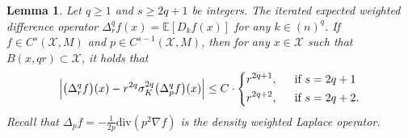 \documentclass{article}
\newcommand{\1}{\mathbf{1}}
\newcommand{\Xset}{\mathcal{X}}
\newcommand{\Ebb}{\mathbb{E}}
\theoremstyle{alden}
\theoremstyle{aldenthm}
\newtheorem{lemma}{Lemma}
\theoremstyle{definition}
\theoremstyle{remark}
\begin{document}
\begin{lemma}
	\label{lem:expected_difference_holder}
	Let $q \geq 1$ and $s \geq 2q + 1$ be integers. The iterated expected weighted difference operator  $\Delta_r^qf(x) = \Ebb[D_kf(x)]$ for any $k \in (n)^q$. If $f \in C^s(\Xset,M)$ and $p \in C^{s-1}(\Xset,M)$, then for any $x \in \Xset$ such that $B(x,qr) \subset \Xset$, it holds that
	\begin{equation*}
	\Bigl|\bigl(\Delta_r^qf\bigr)(x) - r^{2q} \sigma_K^{2q} \bigl(\Delta_{p}^qf\bigr)(x)\Bigr| \leq C \cdot
	\begin{dcases}
	r^{2q + 1},& ~~\textrm{if $s = 2q + 1$} \\
	r^{2q + 2},& ~~\textrm{if $s = 2q + 2$.}
	\end{dcases}
	\end{equation*}
	Recall that $\Delta_pf = -\frac{1}{2p}\mathrm{div}(p^2 \nabla f)$ is the density weighted Laplace operator.
\end{lemma}
\end{document}
